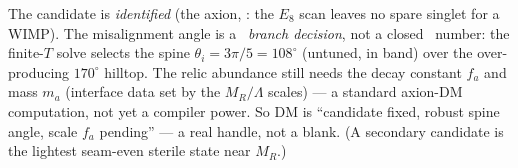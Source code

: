 \documentclass[11pt,a4paper]{article}
\begin{document}
\begin{keybox}
The candidate is \emph{identified} (the axion, \mE: the $E_8$ scan leaves no spare singlet for a WIMP).
The misalignment angle is a \mC\ \emph{branch decision}, not a closed \mE\ number: the finite-$T$ solve
selects the spine $\theta_i=3\pi/5=108^\circ$ (untuned, in band) over the over-producing $170^\circ$
hilltop. The relic abundance still needs the decay constant $f_a$ and mass $m_a$ (interface data set by
the $M_R/\Lambda$ scales) --- a standard axion-DM computation, not yet a compiler power. So DM is
``candidate fixed, robust spine angle, scale $f_a$ pending'' --- a real handle, not a blank. (A secondary
candidate is the lightest seam-even sterile state near $M_R$.)
\end{keybox}
\end{document}
